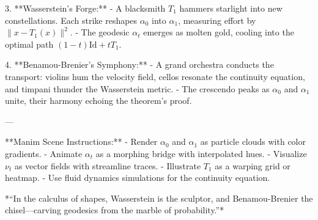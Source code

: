 3. **Wasserstein’s Forge:**  
   - A blacksmith \( T_1 \) hammers starlight into new constellations. Each strike reshapes \( \alpha_0 \) into \( \alpha_1 \), measuring effort by \( \|x - T_1(x)\|^2 \).  
   - The geodesic \( \alpha_t \) emerges as molten gold, cooling into the optimal path \( (1 - t)\text{Id} + tT_1 \).  

4. **Benamou-Brenier’s Symphony:**  
   - A grand orchestra conducts the transport: violins hum the velocity field, cellos resonate the continuity equation, and timpani thunder the Wasserstein metric.  
   - The crescendo peaks as \( \alpha_0 \) and \( \alpha_1 \) unite, their harmony echoing the theorem’s proof.  

---

**Manim Scene Instructions:**  
- Render \( \alpha_0 \) and \( \alpha_1 \) as particle clouds with color gradients.  
- Animate \( \alpha_t \) as a morphing bridge with interpolated hues.  
- Visualize \( \nu_t \) as vector fields with streamline traces.  
- Illustrate \( T_1 \) as a warping grid or heatmap.  
- Use fluid dynamics simulations for the continuity equation.  

*“In the calculus of shapes, Wasserstein is the sculptor, and Benamou-Brenier the chisel—carving geodesics from the marble of probability.”*